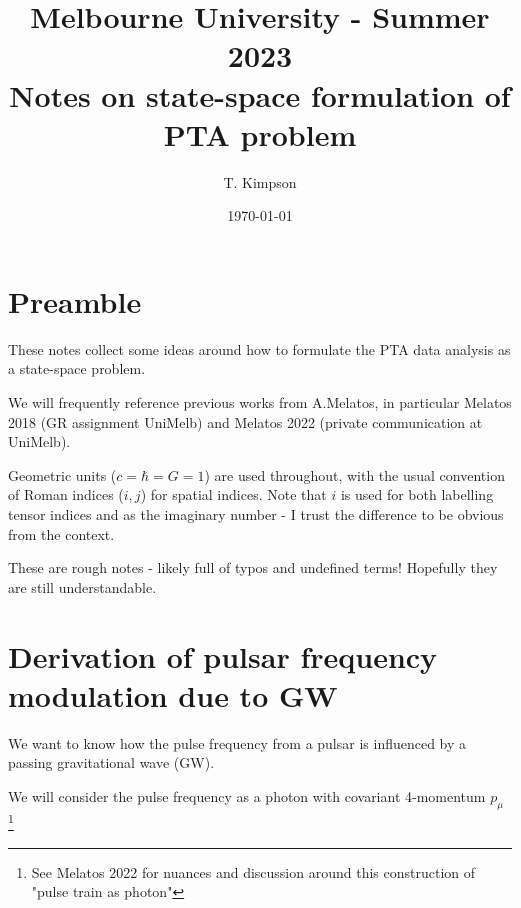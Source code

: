 \documentclass{tufte-handout} %
\title{	
	\normalfont\normalsize 
	{Melbourne University - Summer 2023} \\ [0pt] %
	\huge Notes on state-space formulation of PTA problem%
}\author{T. Kimpson} %
\date{\vspace{-5pt}\normalsize\today} %
\begin{document}
\justifying 
\maketitle


\tableofcontents




\section{Preamble}


These notes collect some ideas around how to formulate the PTA data analysis as a state-space problem. \newline 

\noindent We will frequently reference previous works from A.Melatos, in particular Melatos 2018 (GR assignment UniMelb) and Melatos 2022 (private communication at UniMelb). \newline 

\noindent Geometric units ($c=\hbar = G = 1$) are used throughout, with the usual convention of Roman indices ($i,j$) for spatial indices. Note that $i$ is used for both labelling tensor indices and as the imaginary number - I trust the difference to be obvious from the context.\newline

\noindent These are rough notes - likely full of typos and undefined terms! Hopefully they are still understandable. \newline 


\section{Derivation of pulsar frequency modulation due to GW}
We want to know how the pulse frequency from a pulsar is influenced by a passing gravitational wave (GW). \newline 

\noindent We will consider the pulse frequency as a photon with covariant 4-momentum $p_{\mu}$  \footnote{See Melatos 2022 for nuances and discussion around this construction of "pulse train as photon"} \newline 
\end{document}
